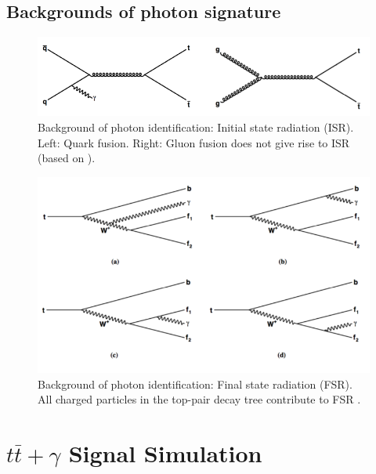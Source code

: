 \subsection{Backgrounds of photon signature}

\begin{figure} \label{fig-BackgroundISR}
\begin{center}
\includegraphics[width=\textwidth]{Figures/BackgroundISR.png}
\caption{Background of photon identification: Initial state radiation (ISR). Left: Quark fusion. Right: Gluon fusion does not give rise to ISR (based on \cite{photonbackgrounds}).}
\end{center}
\end{figure}


\begin{figure} \label{fig-BackgroundFSR}
\begin{center}
\includegraphics[width=\textwidth]{Figures/BackgroundFSR.png}
\caption{Background of photon identification: Final state radiation (FSR). All charged particles in the top-pair decay tree contribute to FSR \cite{photonbackgrounds}.}
\end{center}
\end{figure}

\section{$t\bar{t}+\gamma$ Signal Simulation}

